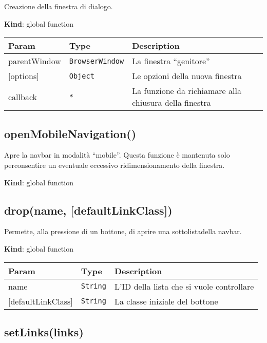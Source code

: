 Creazione della finestra di dialogo.

\textbf{Kind}: global function

\begin{tabularx}{\textwidth}{XXX}
\toprule
Param & Type & Description\tabularnewline
\midrule
\endhead
parentWindow & \texttt{BrowserWindow} & La finestra
``genitore''\tabularnewline
{[}options{]} & \texttt{Object} & Le opzioni della nuova
finestra\tabularnewline
callback & \texttt{*} & La funzione da richiamare alla chiusura della
finestra\tabularnewline
\bottomrule
\end{tabularx}

\protect\hypertarget{openMobileNavigation}{}{}

\hypertarget{openmobilenavigation}{%
\subsection{openMobileNavigation()}\label{openmobilenavigation}}

Apre la navbar in modalità ``mobile''. Questa funzione è mantenuta solo
perconsentire un eventuale eccessivo ridimensionamento della finestra.

\textbf{Kind}: global function\\
\protect\hypertarget{drop}{}{}

\hypertarget{dropname-defaultlinkclass}{%
\subsection{drop(name,
{[}defaultLinkClass{]})}\label{dropname-defaultlinkclass}}

Permette, alla pressione di un bottone, di aprire una sottolistadella
navbar.

\textbf{Kind}: global function

\begin{tabularx}{\textwidth}{XXX}
\toprule
Param & Type & Description\tabularnewline
\midrule
\endhead
name & \texttt{String} & L'ID della lista che si vuole
controllare\tabularnewline
{[}defaultLinkClass{]} & \texttt{String} & La classe iniziale del
bottone\tabularnewline
\bottomrule
\end{tabularx}

\protect\hypertarget{setLinks}{}{}

\hypertarget{setlinkslinks}{%
\subsection{setLinks(links)}\label{setlinkslinks}}

